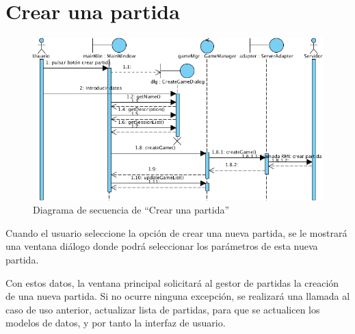 \section{Crear una partida}

\begin{figure}[ht]
\centering
\includegraphics[scale=0.6]{img/ch03devel-creategame.png}
\caption{Diagrama de secuencia de ``Crear una partida''}
\end{figure}

Cuando el usuario seleccione la opción de crear una nueva partida, se le
mostrará una ventana diálogo donde podrá seleccionar los parámetros de esta
nueva partida.

Con estos datos, la ventana principal solicitará al gestor de partidas la
creación de una nueva partida. Si no ocurre ninguna excepción, se realizará una
llamada al caso de uso anterior, actualizar lista de partidas, para que se
actualicen los modelos de datos, y por tanto la interfaz de usuario.
